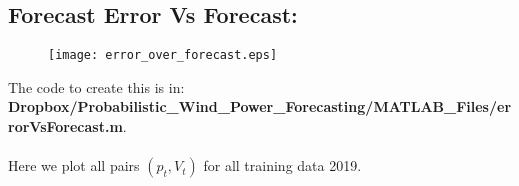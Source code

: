 \documentclass[12pt]{article}
\theoremstyle{definition}
\theoremstyle{remark}
\begin{document}
\subsection*{Forecast Error Vs Forecast:}

\begin{figure}[ht!]
\centering
{\texttt{[image: error\_over\_forecast.eps]}}
\end{figure}

The code to create this is in:\\
\textbf{Dropbox/Probabilistic\_Wind\_Power\_Forecasting/MATLAB\_Files/errorVsForecast.m}.\\
\quad\\
Here we plot all pairs $(p_t,V_t)$ for all training data 2019.
\pagebreak 


%
%
%
\end{document}
